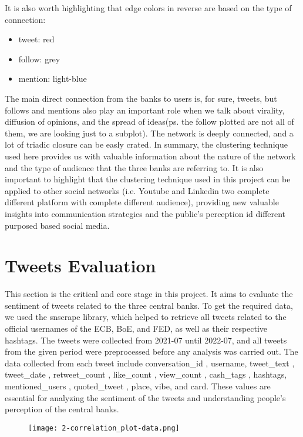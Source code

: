 \documentclass[fleqn,10pt]{SelfArx} %
\begin{document}
It is also worth highlighting that edge colors in reverse are based on the type of connection:
\begin{itemize}[noitemsep] %
	\item tweet: red
	\item follow: grey
	\item mention: light-blue
\end{itemize}
The main direct connection from the banks to users is, for sure, tweets, but follows and mentions also play an important role when we talk about virality, diffusion of opinions, and the spread of ideas(ps. the follow plotted are not all of them, we are looking just to a subplot). The network is deeply connected, and a lot of triadic closure can be easly crated. In summary, the clustering technique used here provides us with valuable information about the nature of the network and the type of audience that the three banks are referring to. It is also important to highlight that the clustering technique used in this project can be applied to other social networks (i.e. Youtube and Linkedin two complete different platform with complete different audience), providing new valuable insights into communication strategies and the public's perception id different purposed based social media.

\section{Tweets Evaluation}
This section is the critical and core stage in this project. It aims to evaluate the sentiment of tweets related to the three central banks. To get the required data, we used the snscrape library, which helped to retrieve all tweets related to the official usernames of the ECB, BoE, and FED, as well as their respective hashtags. The tweets were collected from 2021-07 until 2022-07, and all tweets from the given period were preprocessed before any analysis was carried out. The data collected from each tweet include conversation\_id , username, tweet\_text , tweet\_date , retweet\_count , like\_count , view\_count , cash\_tags , hashtags, mentioned\_users , quoted\_tweet , place, vibe, and card. These values are essential for analyzing the sentiment of the tweets and understanding people's perception of the central banks.


\begin{figure}[ht]\centering
	\texttt{[image: 2-correlation\_plot-data.png]}
	\caption{}
	\label{fig:crltn_plot}
\end{figure}
\end{document}
